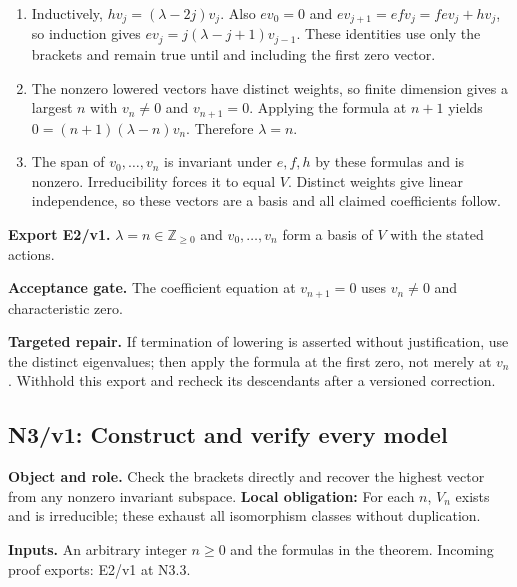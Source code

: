 \documentclass[preprint,12pt,aps,pra,showkeys,amsmath,amssymb,superscriptaddress,floatfix]{revtex4-2}
\theoremstyle{definition}
\theoremstyle{remark}
\newcommand{\field}[2]{\par\smallskip\noindent\textbf{#1.} #2\par}
\begin{document}
\begin{enumerate}[label=N2.\arabic*,leftmargin=3.4em]

\item Inductively, \(hv_j=(\lambda-2j)v_j\). Also \(ev_0=0\) and
\(ev_{j+1}=efv_j=fev_j+hv_j\), so induction gives
\(ev_j=j(\lambda-j+1)v_{j-1}\). These identities use only the brackets
and remain true until and including the first zero vector.

\item The nonzero lowered vectors have distinct weights, so finite dimension
gives a largest \(n\) with \(v_n\ne0\) and \(v_{n+1}=0\). Applying the
formula at \(n+1\) yields \(0=(n+1)(\lambda-n)v_n\). Therefore
\(\lambda=n\).

\item The span of \(v_0,\ldots,v_n\) is invariant under \(e,f,h\) by these
formulas and is nonzero. Irreducibility forces it to equal \(V\).
Distinct weights give linear independence, so these vectors are a basis
and all claimed coefficients follow.

\end{enumerate}

\field{Export E2/v1}{\(\lambda=n\in\mathbb Z_{\ge0}\) and \(v_0,\ldots,v_n\) form a basis of
\(V\) with the stated actions.}

\field{Acceptance gate}{The coefficient equation at \(v_{n+1}=0\) uses \(v_n\ne0\) and
characteristic zero.}

\field{Targeted repair}{If termination of lowering is asserted without justification, use the
distinct eigenvalues; then apply the formula at the first zero, not
merely at \(v_n\). Withhold this export and recheck its descendants
after a versioned correction.}

\clearpage

\begingroup\linespread{1}\fontsize{9.5}{11}\selectfont\renewcommand{\small}{\fontsize{9.5}{11}\selectfont}

\subsection{N3/v1: Construct and verify every model}

\field{Object and role}{Check the brackets directly and recover the highest vector from any
nonzero invariant subspace. \textbf{Local obligation:} For each \(n\),
\(V_n\) exists and is irreducible; these exhaust all isomorphism classes
without duplication.}

\field{Inputs}{An arbitrary integer \(n\ge0\) and the formulas in the theorem. Incoming
proof exports: E2/v1 at N3.3.}
\end{document}
